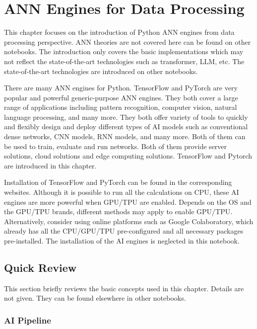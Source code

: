 \chapter{ANN Engines for Data Processing} \label{ch:tftorch} 

This chapter focuses on the introduction of Python ANN engines from data processing perspective. ANN theories are not covered here can be found on other notebooks. The introduction only covers the basic implementations which may not reflect the state-of-the-art technologies such as transformer, LLM, etc. The state-of-the-art technologies are introduced on other notebooks.

There are many ANN engines for Python. TensorFlow and PyTorch are very popular and powerful generic-purpose ANN engines. They both cover a large range of applications including pattern recognition, computer vision, natural language processing, and many more. They both offer variety of tools to quickly and flexibly design and deploy different types of AI models such as conventional dense networks, CNN models, RNN models, and many more. Both of them can be used to train, evaluate and run networks. Both of them provide server solutions, cloud solutions and edge computing solutions.  TensorFlow and Pytorch are introduced in this chapter.  

Installation of TensorFlow and PyTorch can be found in the corresponding websites. Although it is possible to run all the calculations on CPU, these AI engines are more powerful when GPU/TPU are enabled. Depends on the OS and the GPU/TPU brands, different methods may apply to enable GPU/TPU. Alternatively, consider using online platforms such as Google Colaboratory, which already has all the CPU/GPU/TPU pre-configured and all necessary packages pre-installed. The installation of the AI engines is neglected in this notebook.

\section{Quick Review}

This section briefly reviews the basic concepts used in this chapter. Details are not given. They can be found elsewhere in other notebooks.

\subsection{AI Pipeline}

